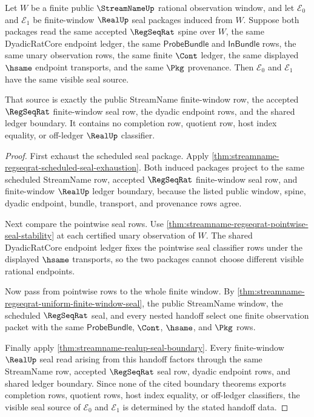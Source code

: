 \begin{theorem}
\label{thm:streamname-regseqrat-realup-seal-source-determinacy}
Let $W$ be a finite public $\StreamNameUp$ rational observation window, and
let $\mathcal{E}_0$ and $\mathcal{E}_1$ be finite-window $\RealUp$ seal
packages induced from $W$. Suppose both packages read the same accepted
$\RegSeqRat$ spine over $W$, the same DyadicRatCore endpoint ledger, the same
$\mathsf{ProbeBundle}$ and $\mathsf{InBundle}$ rows, the same unary
observation rows, the same finite $\Cont$ ledger, the same displayed $\hsame$
endpoint transports, and the same $\Pkg$ provenance. Then $\mathcal{E}_0$ and
$\mathcal{E}_1$ have the same visible seal source.

That source is exactly the public StreamName finite-window row, the accepted
$\RegSeqRat$ finite-window seal row, the dyadic endpoint rows, and the shared
ledger boundary. It contains no completion row, quotient row, host index
equality, or off-ledger $\RealUp$ classifier.
\end{theorem}
\begin{proof}
First exhaust the scheduled seal package. Apply
\autoref{thm:streamname-regseqrat-scheduled-seal-exhaustion}. Both induced
packages project to the same scheduled StreamName row, accepted $\RegSeqRat$
finite-window seal row, and finite-window $\RealUp$ ledger boundary, because
the listed public window, spine, dyadic endpoint, bundle, transport, and
provenance rows agree.

Next compare the pointwise seal rows. Use
\autoref{thm:streamname-regseqrat-pointwise-seal-stability} at each certified
unary observation of $W$. The shared DyadicRatCore endpoint ledger fixes the
pointwise seal classifier rows under the displayed $\hsame$ transports, so the
two packages cannot choose different visible rational endpoints.

Now pass from pointwise rows to the whole finite window. By
\autoref{thm:streamname-regseqrat-uniform-finite-window-seal}, the public
StreamName window, the scheduled $\RegSeqRat$ seal, and every nested handoff
select one finite observation packet with the same $\mathsf{ProbeBundle}$,
$\Cont$, $\hsame$, and $\Pkg$ rows.

Finally apply \autoref{thm:streamname-realup-seal-boundary}. Every
finite-window $\RealUp$ seal read arising from this handoff factors through
the same StreamName row, accepted $\RegSeqRat$ seal row, dyadic endpoint rows,
and shared ledger boundary. Since none of the cited boundary theorems exports
completion rows, quotient rows, host index equality, or off-ledger classifiers,
the visible seal source of $\mathcal{E}_0$ and $\mathcal{E}_1$ is determined
by the stated handoff data.
\end{proof}

